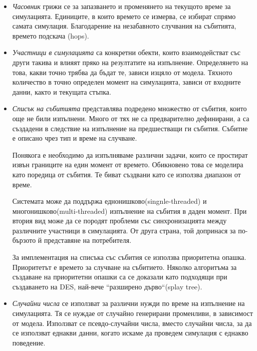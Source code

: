 			\begin{itemize}
						
				\item \emph{Часовник} грижи се за запазването и променянето на текущото време за симулацията.
				Единиците, в които времето се измерва, се избират спрямо самата симулация.
				Благодарение на незабавното случвания на събитията, времето подскача (hops).
				
				\item \emph{Участници в симулацията} са конкретни обекти, които взаимодействат със други такива и 
				влияят пряко на резултатите на изпълнение. Определянето на това, какви точно трябва да бъдат те,
				зависи изцяло от модела. Тяхното количество в точно определен момент на симулацията,
				зависи от входните данни, както и текущата стъпка.
				
				\item \emph{Списък на събитията} представлява подредено множество от събития, които още не били
				изпълнени. Много от тях не са предварително дефинирани, а са създадени в следствие на
				изпълнение на предшестващи ги събития. Събитие е описано чрез тип и време на случване. 
				
				Понякога е необходимо да изпълняваме различни задачи, които се простират извън границите
				на един момент от времето. Обикновено това се моделира като поредица от събития.
				Те биват създвани като се използва диапазон от време.
				
				Системата може да поддържа еднонишково(singnle-threaded) и\\
				многонишково(multi-threaded) изпълнение на събития в даден момент. 
				При втория вид може да се породят проблеми със 
				синхронизацията между различните участници в симулацията. От друга страна,
				той допринася за по-бързото й представяне на потребителя.
				
				За имплементация на списъка със събития се използва приоритетна опашка. Приоритетът е
				времето за случване на събитието. Няколко алгоритъма за създаване на приоритетни опашки
				са се доказали като подходящи при създаването на \ac{DES}\cite{Jones}, най-вече ``разширено дърво``(splay tree).
				
				\item \emph{Случайни числа} се използват за различни нужди по време на изпълнение на симулацията.
				Тя се нуждае от случайно генерирани променливи, в зависимост от модела. 
				Използват се псевдо-случайни числа, вместо случайни числа, за да се използват
				еднакви данни, когато искаме да проведем симулация с еднакво поведение.				
				

\end{itemize}
